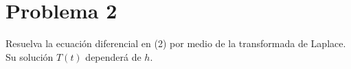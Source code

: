 \section*{Problema 2}
Resuelva la ecuación diferencial en (2) por medio de la transformada de Laplace. 
Su solución $T(t)$ dependerá de $h$.